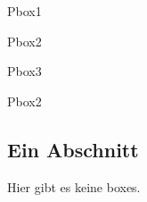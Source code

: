 \documentclass[portrait,a0]{a0poster}
\begin{document}
\begin{poster}
\begin{pcolumn}
      \begin{pbox}
        {\color{red} Pbox1 \vspace{35cm}}
      \end{pbox}
      \begin{pbox}[1. .98 .98]
        {\color{red} Pbox2 \vspace{37cm}}
      \end{pbox}
\end{pcolumn}
\begin{pcolumn}
      \begin{pboxns}
       {\color{red} Pbox3 \vspace{35cm}}
      \end{pboxns}
      \begin{pbox}
        {\color{red} Pbox2 \vspace{35cm}}
      \end{pbox}
\end{pcolumn}
\begin{pcolumn}
\section{Ein Abschnitt}

Hier gibt es keine boxes.
\end{pcolumn}

\end{poster}
\end{document}

